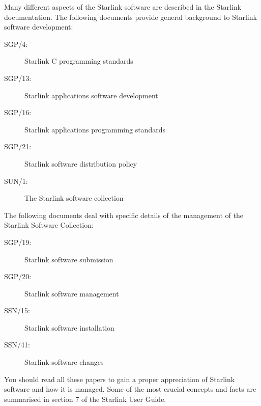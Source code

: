 Many different aspects of the Starlink software are described in the Starlink
documentation.
The following documents provide general background to Starlink software
development:
\begin{description}
\begin{description}
\item [SGP/4:] Starlink C programming standards
\item [SGP/13:] Starlink applications software development
\item [SGP/16:] Starlink applications programming standards
\item [SGP/21:] Starlink software distribution policy
\item [SUN/1:] The Starlink software collection
\end{description}
\end{description}
The following documents deal with specific details of the management of the
Starlink Software Collection:
\begin{description}
\begin{description}
\item [SGP/19:] Starlink software submission
\item [SGP/20:] Starlink software management
\item [SSN/15:] Starlink software installation
\item [SSN/41:] Starlink software changes
\end{description}
\end{description}
You should read all these papers to gain a proper appreciation of Starlink
software and how it is managed.
Some of the most crucial concepts and facts are summarised in section 7 of the
Starlink User Guide.
 
